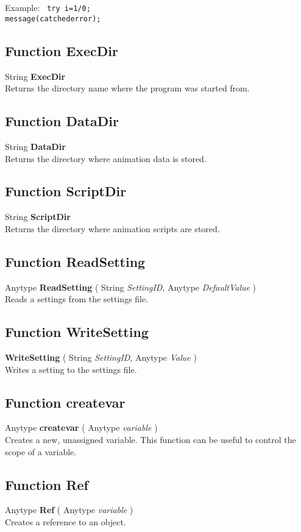 \documentclass[10pt]{book}
\newcommand{\sourcecode}[1]{\texttt{#1}}
\begin{document}
Example:
\sourcecode{
try i=1/0; \\
message(catchederror);
}

\subsection{Function ExecDir \label{F:ExecDir}}
String \textbf{ExecDir} \\
Returns the directory name where the program was started from.

\subsection{Function DataDir \label{F:DataDir}}
String \textbf{DataDir} \\
Returns the directory where animation data is stored.

\subsection{Function ScriptDir \label{F:ScriptDir}}
String \textbf{ScriptDir} \\
Returns the directory where animation scripts are stored.

\subsection{Function ReadSetting \label{F:ReadSetting}}
Anytype \textbf{ReadSetting} ( String \textit{SettingID}, Anytype \textit{DefaultValue} ) \\
Reads a settings from the settings file.

\subsection{Function WriteSetting \label{F:WriteSetting}}
\textbf{WriteSetting} ( String \textit{SettingID}, Anytype \textit{Value} ) \\
Writes a setting to the settings file.

\subsection{Function createvar \label{F:createvar}}
Anytype \textbf{createvar} ( Anytype \textit{variable} ) \\
Creates a new, unassigned variable. This function can be useful to control the scope of a variable.

\subsection{Function Ref \label{F:Ref}}
Anytype \textbf{Ref} ( Anytype \textit{variable} ) \\
Creates a reference to an object.
\end{document}
